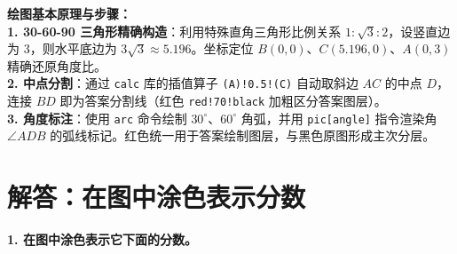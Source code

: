 \vspace{0.6cm}

{\small\color{blue!70!black}
\textbf{绘图基本原理与步骤：}\\
\textbf{1. 30-60-90 三角形精确构造}：利用特殊直角三角形比例关系 $1:\sqrt{3}:2$，设竖直边为 3，则水平底边为 $3\sqrt{3} \approx 5.196$。坐标定位 $B(0,0)$、$C(5.196,0)$、$A(0,3)$ 精确还原角度比。\\
\textbf{2. 中点分割}：通过 \texttt{calc} 库的插值算子 \texttt{(A)!0.5!(C)} 自动取斜边 $AC$ 的中点 $D$，连接 $BD$ 即为答案分割线（红色 \texttt{red!70!black} 加粗区分答案图层）。\\
\textbf{3. 角度标注}：使用 \texttt{arc} 命令绘制 $30^\circ$、$60^\circ$ 角弧，并用 \texttt{pic[angle]} 指令渲染角 $\angle ADB$ 的弧线标记。红色统一用于答案绘制图层，与黑色原图形成主次分层。
}



\section{解答：在图中涂色表示分数}

\vspace{0.4cm}

\noindent\textbf{1. 在图中涂色表示它下面的分数。}

\vspace{0.8cm}

